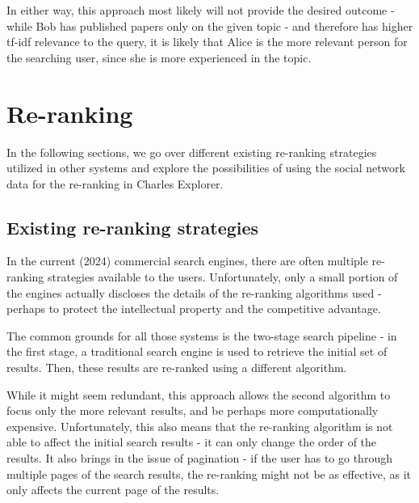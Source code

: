 
In either way, this approach most likely will not provide the desired outcome - while Bob has published papers only on the given topic - and therefore has higher tf-idf relevance to the query,
it is likely that Alice is the more relevant person for the searching user, since she is more experienced in the topic.

\section{Re-ranking}

In the following sections, we go over different existing re-ranking strategies utilized in other systems and explore the possibilities of using the social network data for the re-ranking in Charles Explorer.

\subsection{Existing re-ranking strategies}

In the current (2024) commercial search engines, there are often multiple re-ranking strategies available to the users.
Unfortunately, only a small portion of the engines actually discloses the details of the re-ranking algorithms used - perhaps to protect the intellectual property and the competitive advantage.

The common grounds for all those systems is the two-stage search pipeline - in the first stage, a traditional search engine is used to retrieve the initial set of results.
Then, these results are re-ranked using a different algorithm. 

While it might seem redundant, this approach allows the second algorithm to focus only the more relevant results, and be perhaps more computationally expensive.
Unfortunately, this also means that the re-ranking algorithm is not able to affect the initial search results - it can only change the order of the results.
It also brings in the issue of pagination - if the user has to go through multiple pages of the search results, the re-ranking might not be as effective,
as it only affects the current page of the results.

